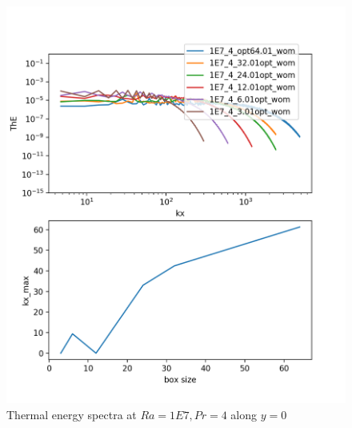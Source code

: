\documentclass[12pt]{article}
\begin{document}
  \begin{figure}[!htb]
  	\includegraphics[width=\linewidth]{ThE_1E7_4.png}
  	\caption{ Thermal energy spectra at $Ra = 1E7, Pr =4$ along $y = 0$}
  	\label{fig:fig13}
  \end{figure}
\end{document}
